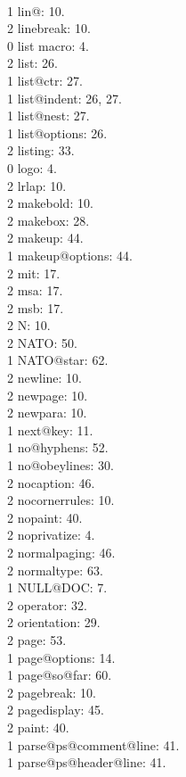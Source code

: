 \\1 lin@: 10.
\\2 linebreak: 10.
\\0 list macro: 4.
\\2 list: 26.
\\1 list@ctr: 27.
\\1 list@indent: 26, 27.
\\1 list@nest: 27.
\\1 list@options: 26.
\\2 listing: 33.
\\0 logo: 4.
\\2 lrlap: 10.
\\2 makebold: 10.
\\2 makebox: 28.
\\2 makeup: 44.
\\1 makeup@options: 44.
\\2 mit: 17.
\\2 msa: 17.
\\2 msb: 17.
\\2 N: 10.
\\2 NATO: 50.
\\1 NATO@star: 62.
\\2 newline: 10.
\\2 newpage: 10.
\\2 newpara: 10.
\\1 next@key: 11.
\\1 no@hyphens: 52.
\\1 no@obeylines: 30.
\\2 nocaption: 46.
\\2 nocornerrules: 10.
\\2 nopaint: 40.
\\2 noprivatize: 4.
\\2 normalpaging: 46.
\\2 normaltype: 63.
\\1 NULL@DOC: 7.
\\2 operator: 32.
\\2 orientation: 29.
\\2 page: 53.
\\1 page@options: 14.
\\1 page@so@far: 60.
\\2 pagebreak: 10.
\\2 pagedisplay: 45.
\\2 paint: 40.
\\1 parse@ps@comment@line: 41.
\\1 parse@ps@header@line: 41.
